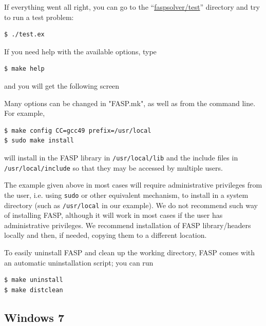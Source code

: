 \documentclass[11pt]{memoir}
\begin{document}
If everything went all right, you can go to the
``\url{faspsolver/test}'' directory and try to run a test problem:
%
\begin{lstlisting}[numbers=none]
$ ./test.ex
\end{lstlisting}
%
If you need help with the available options, type 
%
\begin{lstlisting}[numbers=none]
$ make help
\end{lstlisting}
%
and you will get the following screen


Many options can be changed in "FASP.mk", as well as from the command
line. For example,
\begin{lstlisting}[numbers=none]
$ make config CC=gcc49 prefix=/usr/local
$ sudo make install
\end{lstlisting}
will install in the FASP library in \verb|/usr/local/lib| and the
include files in \verb|/usr/local/include| so that they may be
accessed by multiple users.

\begin{snugshade}\noindent
  The example given above in most cases will require administrative
  privileges from the user, i.e. using \verb|sudo| or other equivalent
  mechanism, to install in a system directory (such as
  \verb|/usr/local| in our example). We do not recommend such way of
  installing FASP, although it will work in most cases if the user has
  administrative privileges.  We recommend installation of FASP
  library/headers locally and then, if needed, copying them to a
  different location.
\end{snugshade}

To easily uninstall FASP and clean up the working directory, FASP comes with an automatic uninstallation script; you can run
%
\begin{lstlisting}[numbers=none]
$ make uninstall
$ make distclean
\end{lstlisting}
%

\subsection{Windows 7}
\end{document}
